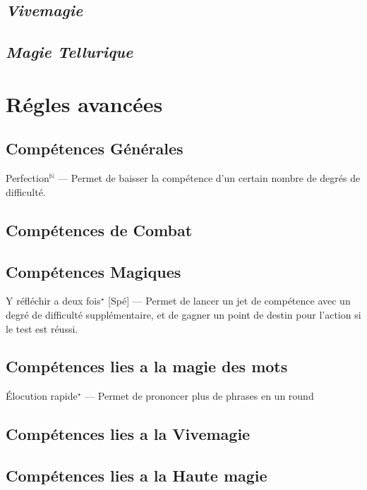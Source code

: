 \subsection{\em Vivemagie}
\subsection{\em Magie Tellurique}
\section{Régles avancées}
\subsection{Compétences Générales}
Perfection$^\mathbb{N}$ — Permet de baisser la compétence d’un certain nombre de degrés de difficulté.
\subsection{Compétences de Combat}
\subsection{Compétences Magiques}
Y réfléchir a deux fois$^\star$ [Spé] — Permet de lancer un jet de compétence avec un degré de difficulté supplémentaire, 
et de gagner un point de destin pour l’action si le test est réussi.
\subsection{Compétences lies a la magie des mots}
Élocution rapide$^\star$  — Permet de prononcer plus de phrases en un round
\subsection{Compétences lies a la Vivemagie}
\subsection{Compétences lies a la Haute magie}